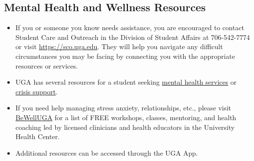 \documentclass[11pt, letterpaper]{article}
\begin{document}
\subsection*{Mental Health and Wellness Resources}

\begin{itemize}
\item If you or someone you know needs assistance, you are encouraged to contact Student Care and Outreach in the Division of Student Affairs at 706-542-7774 or visit \href{https://sco.uga.edu}{https://sco.uga.edu}. They will help you navigate any difficult circumstances you may be facing by connecting you with the appropriate resources or services. 
\item UGA has several resources for a student seeking \href{https://www.uhs.uga.edu/bewelluga/bewelluga}{mental health services} or \href{https://www.uhs.uga.edu/info/emergencies}{crisis support}. 
\item If you need help managing stress anxiety, relationships, etc., please visit \href{https://www.uhs.uga.edu/bewelluga/bewelluga}{BeWellUGA} for a list of FREE workshops, classes, mentoring, and health coaching led by licensed clinicians and health educators in the University Health Center.
\item Additional resources can be accessed through the UGA App.
\end{itemize}



\end{document}
